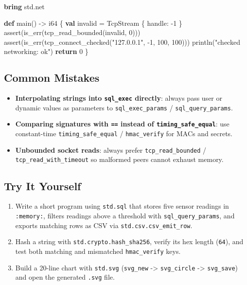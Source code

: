 \documentclass[
  english,
  oneside]{book}
\newenvironment{Shaded}{\begin{snugshade}}{\end{snugshade}}
\newcommand{\ControlFlowTok}[1]{\textcolor[rgb]{0.77,0.53,0.75}{\textbf{#1}}}
\newcommand{\DataTypeTok}[1]{\textcolor[rgb]{0.31,0.79,0.69}{#1}}
\newcommand{\DecValTok}[1]{\textcolor[rgb]{0.71,0.81,0.66}{#1}}
\newcommand{\FunctionTok}[1]{\textcolor[rgb]{0.86,0.86,0.67}{#1}}
\newcommand{\KeywordTok}[1]{\textcolor[rgb]{0.34,0.61,0.84}{\textbf{#1}}}
\newcommand{\NormalTok}[1]{\textcolor[rgb]{0.83,0.83,0.83}{#1}}
\newcommand{\OperatorTok}[1]{\textcolor[rgb]{0.83,0.83,0.83}{#1}}
\newcommand{\StringTok}[1]{\textcolor[rgb]{0.81,0.57,0.47}{#1}}
\providecommand{\tightlist}{%
  \setlength{\itemsep}{0pt}\setlength{\parskip}{0pt}}
\begin{document}
\begin{Shaded}
\begin{Highlighting}[]
\KeywordTok{bring}\NormalTok{ std}\OperatorTok{.}\NormalTok{net}

\KeywordTok{def}\NormalTok{ main() }\OperatorTok{{-}\textgreater{}} \DataTypeTok{i64}\NormalTok{ \{}
    \KeywordTok{val}\NormalTok{ invalid }\OperatorTok{=}\NormalTok{ TcpStream \{ handle: }\OperatorTok{{-}}\DecValTok{1}\NormalTok{ \}}
    \FunctionTok{assert}\NormalTok{(}\FunctionTok{is\_err}\NormalTok{(tcp\_read\_bounded(invalid, }\DecValTok{0}\NormalTok{)))}
    \FunctionTok{assert}\NormalTok{(}\FunctionTok{is\_err}\NormalTok{(tcp\_connect\_checked(}\StringTok{"127.0.0.1"}\NormalTok{, }\OperatorTok{{-}}\DecValTok{1}\NormalTok{, }\DecValTok{100}\NormalTok{, }\DecValTok{100}\NormalTok{)))}
\NormalTok{    println(}\StringTok{"checked networking: ok"}\NormalTok{)}
    \ControlFlowTok{return} \DecValTok{0}
\NormalTok{\}}
\end{Highlighting}
\end{Shaded}

\subsection{Common Mistakes}\label{common-mistakes-10}

\begin{itemize}
\tightlist
\item
  \textbf{Interpolating strings into \texttt{sql\_exec} directly}:
  always pass user or dynamic values as parameters to
  \texttt{sql\_exec\_params} / \texttt{sql\_query\_params}.
\item
  \textbf{Comparing signatures with \texttt{==} instead of
  \texttt{timing\_safe\_equal}}: use constant-time
  \texttt{timing\_safe\_equal} / \texttt{hmac\_verify} for MACs and
  secrets.
\item
  \textbf{Unbounded socket reads}: always prefer
  \texttt{tcp\_read\_bounded} / \texttt{tcp\_read\_with\_timeout} so
  malformed peers cannot exhaust memory.
\end{itemize}

\subsection{Try It Yourself}\label{try-it-yourself-10}

\begin{enumerate}
\def\labelenumi{\arabic{enumi}.}
\tightlist
\item
  Write a short program using \texttt{std.sql} that stores five sensor
  readings in \texttt{:memory:}, filters readings above a threshold with
  \texttt{sql\_query\_params}, and exports matching rows as CSV via
  \texttt{std.csv.csv\_emit\_row}.
\item
  Hash a string with \texttt{std.crypto.hash\_sha256}, verify its hex
  length (\texttt{64}), and test both matching and mismatched
  \texttt{hmac\_verify} keys.
\item
  Build a 20-line chart with \texttt{std.svg} (\texttt{svg\_new}
  -\textgreater{} \texttt{svg\_circle} -\textgreater{}
  \texttt{svg\_save}) and open the generated \texttt{.svg} file.
\end{enumerate}
\end{document}
